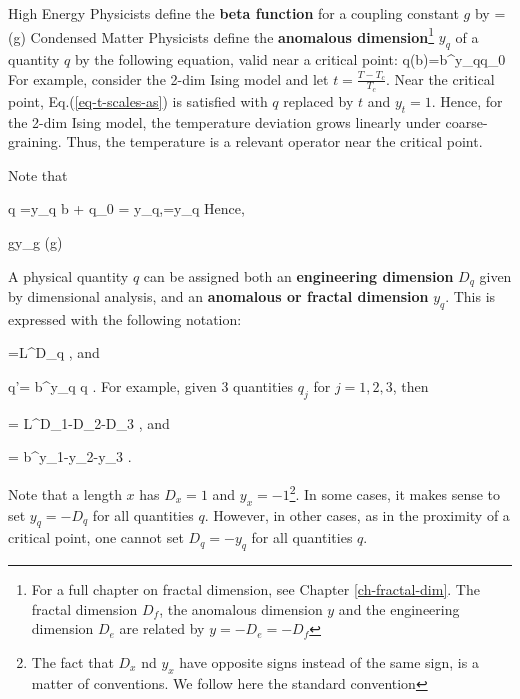 \documentclass[12pt]{report}
\begin{document}
High Energy Physicists define the {\bf beta
function} for a coupling 
constant $g$ by
\beq
{} = \beta(g)
\eeq
Condensed Matter
Physicists define
the {\bf anomalous dimension}\footnote{For a full
chapter on fractal dimension, see
Chapter \ref{ch-fractal-dim}.
The fractal dimension $D_f$,
the anomalous dimension $y$
and the engineering
dimension $D_e$ are related
by $y=-D_e=-D_f$} $y_q$ of a quantity $q$
by the following equation, valid near a critical point:
\beq
q(b)=b^{y_q}q_0
\label{eq-t-scales-as}
\eeq
For example, 
consider the 2-dim Ising model 
and let $t = \frac{T-T_c}{T_c}$.
Near the  critical point,
Eq.(\ref{eq-t-scales-as})
is satisfied with $q$ replaced by $t$ and $y_t=1$.
Hence, for the 2-dim Ising model, the  temperature deviation grows linearly under coarse-graining.
Thus, the temperature is a relevant operator near the critical point.

Note that

\beq
\ln q =y_q \ln b + \ln q_0
\implies
{} = y_q,\quad{}=y_q
\eeq
Hence, 

\beq
gy_g \approx \beta(g)
\eeq

A physical quantity $q$
can be assigned both an \textbf{engineering dimension} $D_q$
given by dimensional analysis,
and an \textbf{anomalous or fractal dimension}
 $y_q$.
This is expressed with the following notation:

\beq
[q]=L^{D_q}
\;,
\eeq
and

\beq
q'= b^{y_q} q
\;.
\label{eq-def-fractal}
\eeq
For example,
given 3 quantities $q_j$ for $j=1,2,3$, then

\beq
{}=
L^{D_1-D_2-D_3}
\;,
\eeq
and

\beq
{}
= b^{y_1-y_2-y_3}
\;.
\eeq

Note that a length $x$ has
$D_x=1$ and $y_x=-1$\footnote{The fact that $D_x$ nd $y_x$
have opposite signs
instead of the same sign,
is a matter of conventions. 
We follow here the standard
convention}.
In some cases, it makes sense
to set $y_q=-D_q$ for all quantities $q$.
However, in other
cases, as in the proximity
of a critical point, one cannot set $D_q=-y_q$
for all quantities $q$. 
\end{document}
